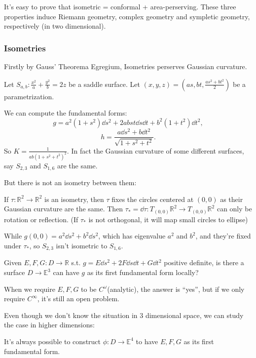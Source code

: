 It's easy to prove that isometric = conformal + area-perserving.
These three properties induce Riemann geometry, complex geometry
and sympletic geometry, respectively (in two dimensional).

\subsubsection{Isometries}
Firstly by Gauss' Theorema Egregium, Isometries perserves
Gaussian curvature.

\begin{example}
    Let $S_{a,b}: \frac{x^2}{a} + \frac{y^2}{b} = 2z$ be a saddle surface.
	Let $(x,y,z) = (as, bt, \frac{as^2+bt^2}{2})$ be a parametrization.

	We can compute the fundamental forms:
	\[
	g = a^2(1+s^2)\dd s^2 + 2abst\dd s\dd t + b^2(1+t^2)\dd t^2,
	\]
	\[
	h = \frac{a\dd s^2 + b\dd t^2}{\sqrt{1+s^2+t^2}}.
	\]
	So $K = \frac{1}{ab(1+s^2+t^2)^2}$.
	In fact the Gaussian curvature of some different surfaces,
	say $S_{2,3}$ and $S_{1,6}$ are the same.

	But there is not an isometry between them:

	If $\tau: \mathbb{R}^2\to \mathbb{R}^2$ is an isometry, then $\tau$ fixes
	the circles centered at $(0,0)$ as their Gaussian curvature are the same.
	Then $\tau_*=\dd \tau: T_{(0,0)}\mathbb{R}^2\to T_{(0,0)}\mathbb{R}^2$ can
	only be rotation or reflection.
	(If $\tau_*$ is not orthogonal, it will map small circles to ellipse)

	While $g(0,0) = a ^2\dd s^2 + b^2\dd s^2$, which has eigenvalue $a^2$
	and $b^2$, and they're fixed under $\tau_*$, so $S_{2,3}$ isn't
	isometric to $S_{1,6}$.
\end{example}
\begin{remark}
    Given $E,F,G: D\to \mathbb{R}$ s.t. $g = E\dd s^2 + 2F\dd s\dd t + G\dd t^2$
	positive definite, is there a surface $D\to \mathbb{E}^3$ can have
	$g$ as its first fundamental form locally?

	When we require $E,F,G$ to be $C^{\omega}$(analytic), the answer is ``yes'',
	but if we only require $C^{\infty}$, it's still an open problem.
\end{remark}

Even though we don't know the situation in 3 dimensional space,
we can study the case in higher dimensions:
\begin{theorem}
    It's always possible to construct $\phi: D\to \mathbb{E}^4$ to
	have $E,F,G$ as its first fundamental form.
\end{theorem}

